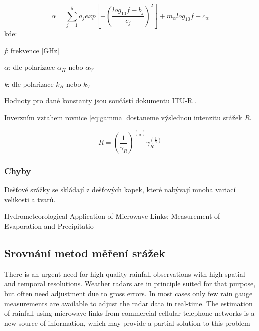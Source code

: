 \documentclass[a4paper,12pt]{article}
\begin{document}
\begin{equation}
\alpha=\sum_{j=1}^{5} a_{j} exp\left [ -\left ( \frac{log_{10}f-b_{j}}{c_{j}} \right )^{2} \right ]+m{_{\alpha }}log_{10}f+c_{\alpha }
\end{equation}
kde:

\emph{f}: frekvence [GHz]

\emph{$\alpha$}:  dle polarizace \emph{$\alpha_{H}$} nebo \emph{$\alpha_{V}$}

\emph{k}: dle polarizace  \emph{$k_{H}$} nebo \emph{$k_{V}$}

{\raggedright{}Hodnoty pro dané konstanty jsou součástí dokumentu ITU-R \cite{itu}.}
\bigskip

{\raggedright{}Inverzním vztahem rovnice \eqref{eq:gamma} dostaneme výslednou intenzitu srážek \emph{R}. }




\begin{equation}
R=\left ( \frac{1}{\gamma _{R}} \right )^{\left ( \frac{1}{\alpha } \right )}  \gamma _{R}^{\left ( \frac{1}{\alpha } \right )}
\end{equation}


\subsubsection{Chyby}

Dešťové srážky se skládají z dešťových kapek, které nabývají mnoha variací velikosti a tvarů. 




Hydrometeorological Application of Microwave Links: Measurement of Evaporation 
and Precipitatio
\subsection{Srovnání metod měření srážek}


There is an urgent need for high-quality rainfall observations with high spatial and temporal resolutions. Weather radars are 
in principle suited for that purpose, but often need adjustment due to gross errors. In most cases only few rain gauge 
measurements are available to adjust the radar data in real-time. The estimation of rainfall using microwave links from 
commercial cellular telephone networks is a new source of information, which may provide a partial solution to this problem

\end{document}
